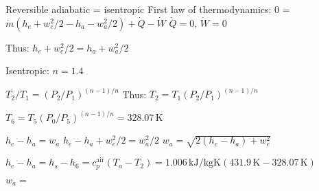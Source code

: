Reversible adiabatic = isentropic  
First law of thermodynamics:  
0 = \( \dot{m} (h_e + w_e^2 / 2 - h_a - w_a^2 / 2) + \dot{Q} - \dot{W} \)  
\( \dot{Q} = 0 \), \( \dot{W} = 0 \)  

Thus:  
\( h_e + w_e^2 / 2 = h_a + w_a^2 / 2 \)  

Isentropic: \( n = 1.4 \)  

\( T_2 / T_1 = (P_2 / P_1)^{(n-1)/n} \)  
Thus:  
\( T_2 = T_1 (P_2 / P_1)^{(n-1)/n} \)  

\( T_6 = T_5 (P_0 / P_5)^{(n-1)/n} = 328.07 \, \text{K} \)  

\( h_e - h_a = w_a \)  
\( h_e - h_a + w_e^2 / 2 = w_a^2 / 2 \)  
\( w_a = \sqrt{2(h_e - h_a) + w_e^2} \)  

\( h_e - h_a = h_s - h_6 = c_p^{\text{air}} (T_a - T_2) = 1.006 \, \text{kJ/kgK} (431.9 \, \text{K} - 328.07 \, \text{K}) \)  

\( w_a = \)